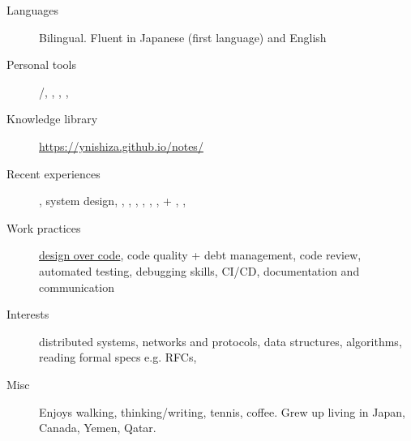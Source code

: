 \begin{description}
  \liststyle
  \item[Languages]{Bilingual. Fluent in Japanese (first language) and English}
  \item[Personal tools]{\rfneovim /\rfvim, \rfbash, \rfgit, \rftmux, \rffirefox }
  \item[Knowledge library]{\href{https://ynishiza.github.io/notes/}{https://ynishiza.github.io/notes/}}
  \item[Recent experiences]{\rfnodejs, system design, \rfmongodb, \rfredis, \rfneofj, \rfdocker, \rfreact, \rfcypress, \rfgit + \rfgithub, \rfaws, \rfjenkins }
  \item[Work practices]{\href{https://ynishiza.github.io/codingprinciples}{design over code}, code quality + debt management, code review, automated testing, debugging skills, CI/CD, documentation and communication }
  \item[Interests]{distributed systems, networks and protocols, data structures, algorithms, reading formal specs e.g. RFCs, \rfhaskell }
  \item[Misc]{Enjoys walking, thinking/writing, tennis, coffee. Grew up living in Japan, Canada, Yemen, Qatar.}
\end{description}
